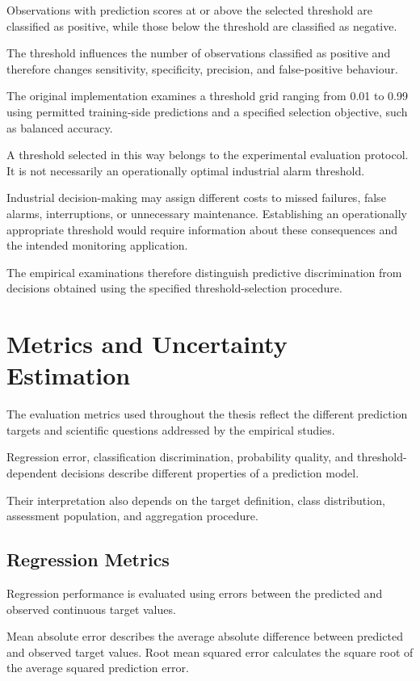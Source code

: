Observations with prediction scores at or above the selected threshold are classified as positive, while those below the threshold are classified as negative.

The threshold influences the number of observations classified as positive and therefore changes sensitivity, specificity, precision, and false-positive behaviour.

The original implementation examines a threshold grid ranging from 0.01 to 0.99 using permitted training-side predictions and a specified selection objective, such as balanced accuracy.

A threshold selected in this way belongs to the experimental evaluation protocol. It is not necessarily an operationally optimal industrial alarm threshold.

Industrial decision-making may assign different costs to missed failures, false alarms, interruptions, or unnecessary maintenance. Establishing an operationally appropriate threshold would require information about these consequences and the intended monitoring application.

The empirical examinations therefore distinguish predictive discrimination from decisions obtained using the specified threshold-selection procedure.

\section{Metrics and Uncertainty Estimation}
\label{sec:ch4-metrics}

The evaluation metrics used throughout the thesis reflect the different prediction targets and scientific questions addressed by the empirical studies.

Regression error, classification discrimination, probability quality, and threshold-dependent decisions describe different properties of a prediction model.

Their interpretation also depends on the target definition, class distribution, assessment population, and aggregation procedure.

\subsection{Regression Metrics}

Regression performance is evaluated using errors between the predicted and observed continuous target values.

Mean absolute error describes the average absolute difference between predicted and observed target values. Root mean squared error calculates the square root of the average squared prediction error.

